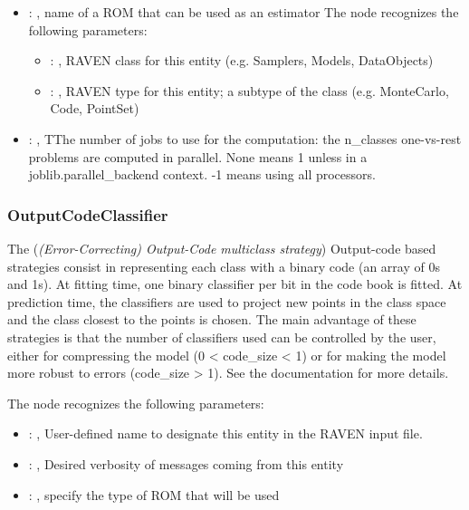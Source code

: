 \begin{itemize}
    \item {}: , 
      name of a ROM that can be used as an estimator
      The  node recognizes the following parameters:
        \begin{itemize}
          \item {}: , 
            RAVEN class for this entity (e.g. Samplers, Models, DataObjects)
          \item {}: , 
            RAVEN type for this entity; a subtype of the class (e.g. MonteCarlo, Code, PointSet)
      \end{itemize}

    \item {}: , 
      TThe number of jobs to use for the computation: the n\_classes one-vs-rest
      problems are computed in parallel. None means 1 unless in a joblib.parallel\_backend
      context. -1 means using all processors.
  \end{itemize}


\subsubsection{OutputCodeClassifier}
  The  (\textit{(Error-Correcting) Output-Code multiclass strategy})
  Output-code based strategies consist in representing each class with a binary code (an array of
  0s and 1s). At fitting time, one binary classifier per bit in the code book is fitted. At
  prediction time, the classifiers are used to project new points in the class space and the class
  closest to the points is chosen. The main advantage of these strategies is that the number of
  classifiers used can be controlled by the user, either for compressing the model
  (0 < code\_size < 1) or for making the model more robust to errors (code\_size > 1). See the
  documentation for more details.

  The  node recognizes the following parameters:
    \begin{itemize}
      \item {}: , 
        User-defined name to designate this entity in the RAVEN input file.
      \item {}: , 
        Desired verbosity of messages coming from this entity
      \item {}: , 
        specify the type of ROM that will be used
  \end{itemize}

